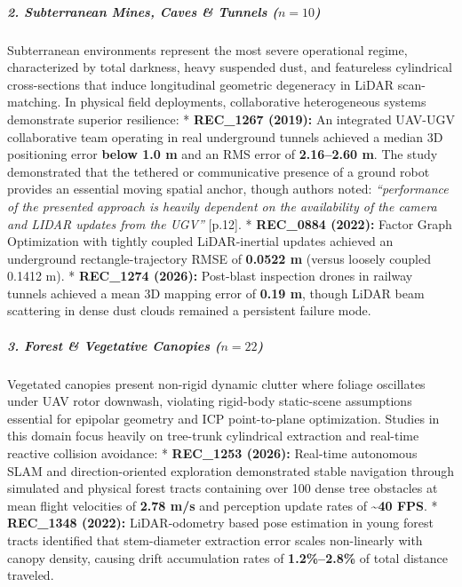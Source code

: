 \documentclass[journal]{IEEEtran}
\begin{document}
\subparagraph{\texorpdfstring{2. Subterranean Mines, Caves \& Tunnels
(\(n = 10\))}{2. Subterranean Mines, Caves \& Tunnels (n = 10)}}\label{subterranean-mines-caves-tunnels-n-10}

Subterranean environments represent the most severe operational regime,
characterized by total darkness, heavy suspended dust, and featureless
cylindrical cross-sections that induce longitudinal geometric degeneracy
in LiDAR scan-matching. In physical field deployments, collaborative
heterogeneous systems demonstrate superior resilience: *
\textbf{REC\_1267 (2019):} An integrated UAV-UGV collaborative team
operating in real underground tunnels achieved a median 3D positioning
error \textbf{below 1.0 m} and an RMS error of \textbf{2.16--2.60 m}.
The study demonstrated that the tethered or communicative presence of a
ground robot provides an essential moving spatial anchor, though authors
noted: \emph{``performance of the presented approach is heavily
dependent on the availability of the camera and LIDAR updates from the
UGV''} {[}p.12{]}. * \textbf{REC\_0884 (2022):} Factor Graph
Optimization with tightly coupled LiDAR-inertial updates achieved an
underground rectangle-trajectory RMSE of \textbf{0.0522 m} (versus
loosely coupled 0.1412 m). * \textbf{REC\_1274 (2026):} Post-blast
inspection drones in railway tunnels achieved a mean 3D mapping error of
\textbf{0.19 m}, though LiDAR beam scattering in dense dust clouds
remained a persistent failure mode.

\subparagraph{\texorpdfstring{3. Forest \& Vegetative Canopies
(\(n = 22\))}{3. Forest \& Vegetative Canopies (n = 22)}}\label{forest-vegetative-canopies-n-22}

Vegetated canopies present non-rigid dynamic clutter where foliage
oscillates under UAV rotor downwash, violating rigid-body static-scene
assumptions essential for epipolar geometry and ICP point-to-plane
optimization. Studies in this domain focus heavily on tree-trunk
cylindrical extraction and real-time reactive collision avoidance: *
\textbf{REC\_1253 (2026):} Real-time autonomous SLAM and
direction-oriented exploration demonstrated stable navigation through
simulated and physical forest tracts containing over 100 dense tree
obstacles at mean flight velocities of \textbf{2.78 m/s} and perception
update rates of \textbf{\textasciitilde40 FPS}. * \textbf{REC\_1348
(2022):} LiDAR-odometry based pose estimation in young forest tracts
identified that stem-diameter extraction error scales non-linearly with
canopy density, causing drift accumulation rates of
\textbf{1.2\%--2.8\%} of total distance traveled.
\end{document}
